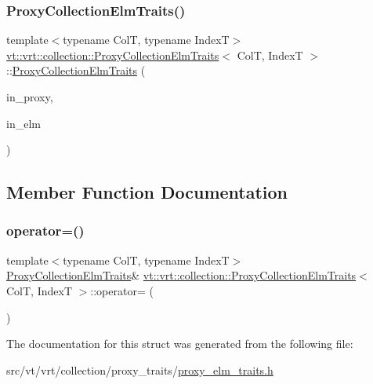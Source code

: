 \subsubsection{\texorpdfstring{Proxy\+Collection\+Elm\+Traits()}{ProxyCollectionElmTraits()}\hspace{0.1cm}{\footnotesize\ttfamily [4/4]}}
{\footnotesize\ttfamily template$<$typename ColT, typename IndexT$>$ \\
\hyperlink{structvt_1_1vrt_1_1collection_1_1_proxy_collection_elm_traits}{vt\+::vrt\+::collection\+::\+Proxy\+Collection\+Elm\+Traits}$<$ ColT, IndexT $>$\+::\hyperlink{structvt_1_1vrt_1_1collection_1_1_proxy_collection_elm_traits}{Proxy\+Collection\+Elm\+Traits} (\begin{DoxyParamCaption}\item[{typename \hyperlink{namespacevt_1_1vrt_1_1collection_1_1elm__proxy_af1c695e3f939aca249111179a57b24bf}{elm\+\_\+proxy\+::\+Chain1}$<$ ColT, IndexT $>$\+::Proxy\+Type const \&}]{in\+\_\+proxy,  }\item[{typename \hyperlink{namespacevt_1_1vrt_1_1collection_1_1elm__proxy_af1c695e3f939aca249111179a57b24bf}{elm\+\_\+proxy\+::\+Chain1}$<$ ColT, IndexT $>$\+::Element\+Proxy\+Type const \&}]{in\+\_\+elm }\end{DoxyParamCaption})\hspace{0.3cm}{\ttfamily [inline]}}



\subsection{Member Function Documentation}
\mbox{\label{structvt_1_1vrt_1_1collection_1_1_proxy_collection_elm_traits_a9a731128f131124782a61937aa8e0f5e}} 
\subsubsection{\texorpdfstring{operator=()}{operator=()}}
{\footnotesize\ttfamily template$<$typename ColT, typename IndexT$>$ \\
\hyperlink{structvt_1_1vrt_1_1collection_1_1_proxy_collection_elm_traits}{Proxy\+Collection\+Elm\+Traits}\& \hyperlink{structvt_1_1vrt_1_1collection_1_1_proxy_collection_elm_traits}{vt\+::vrt\+::collection\+::\+Proxy\+Collection\+Elm\+Traits}$<$ ColT, IndexT $>$\+::operator= (\begin{DoxyParamCaption}\item[{\hyperlink{structvt_1_1vrt_1_1collection_1_1_proxy_collection_elm_traits}{Proxy\+Collection\+Elm\+Traits}$<$ ColT, IndexT $>$ const \&}]{ }\end{DoxyParamCaption})\hspace{0.3cm}{\ttfamily [default]}}



The documentation for this struct was generated from the following file\+:\begin{DoxyCompactItemize}
\item 
src/vt/vrt/collection/proxy\+\_\+traits/\hyperlink{proxy__elm__traits_8h}{proxy\+\_\+elm\+\_\+traits.\+h}\end{DoxyCompactItemize}
